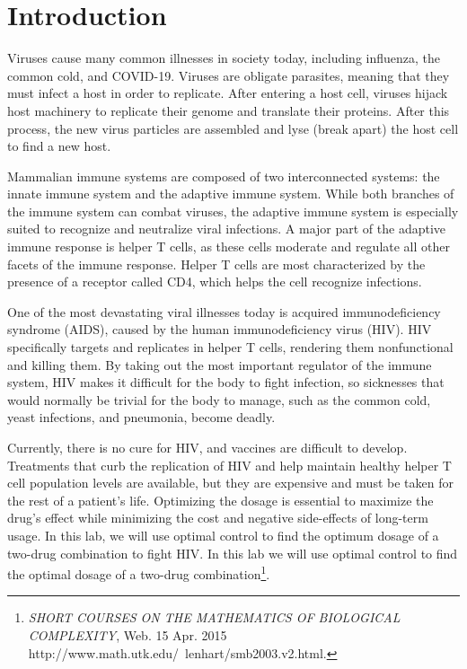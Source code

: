 \label{lab:hiv}

\section*{Introduction}
Viruses cause many common illnesses in society today, including influenza, the common cold, and COVID-19.
Viruses are obligate parasites, meaning that they must infect a host in order to replicate.
After entering a host cell, viruses hijack host machinery to replicate their genome and translate their proteins.
After this process, the new virus particles are assembled and lyse (break apart) the host cell to find a new host.

Mammalian immune systems are composed of two interconnected systems: the innate immune system and the adaptive immune system.
While both branches of the immune system can combat viruses, the adaptive immune system is especially suited to recognize and neutralize viral infections.
A major part of the adaptive immune response is helper T cells, as these cells moderate and regulate all other facets of the immune response.
Helper T cells are most characterized by the presence of a receptor called CD4, which helps the cell recognize infections.

One of the most devastating viral illnesses today is acquired immunodeficiency syndrome (AIDS), caused by the human immunodeficiency virus (HIV).
HIV specifically targets and replicates in helper T cells, rendering them nonfunctional and killing them.
By taking out the most important regulator of the immune system, HIV makes it difficult for the body to fight infection, so sicknesses that would normally be trivial for the body to manage, such as the common cold, yeast infections, and pneumonia, become deadly.

Currently, there is no cure for HIV, and vaccines are difficult to develop.
Treatments that curb the replication of HIV and help maintain healthy helper T cell population levels are available, but they are expensive and must be taken for the rest of a patient's life.
Optimizing the dosage is essential to maximize the drug's effect while minimizing the cost and negative side-effects of long-term usage.
In this lab, we will use optimal control to find the optimum dosage of a two-drug combination to fight HIV.
In this lab we will use optimal control to find the optimal dosage of a two-drug combination\footnote{\textit{SHORT COURSES ON THE MATHEMATICS OF BIOLOGICAL COMPLEXITY}, Web. 15 Apr. 2015 http://www.math.utk.edu/~lenhart/smb2003.v2.html.}.

